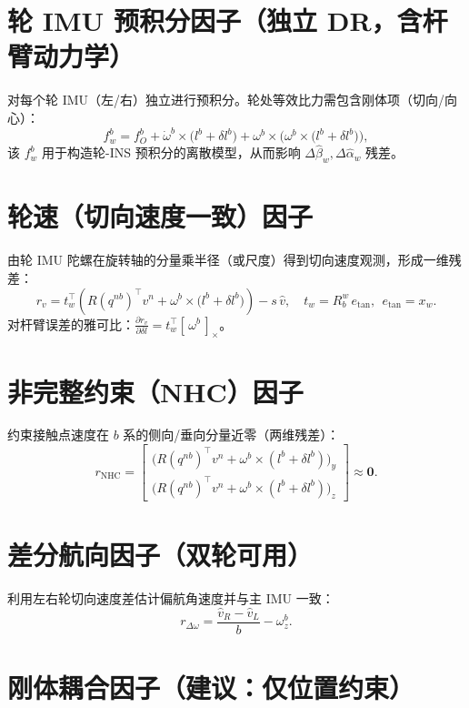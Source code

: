 \documentclass[11pt]{article}
\begin{document}
\section{轮 IMU 预积分因子（独立 DR，含杆臂动力学）}
对每个轮 IMU（左/右）独立进行预积分。轮处等效比力需包含刚体项（切向/向心）：
\begin{equation}
f_{w}^b = f_O^b + \dot{\omega}^b \times \big(l^b + \delta l^b\big)
+ \omega^b \times \Big(\omega^b \times \big(l^b + \delta l^b\big)\Big),
\end{equation}
该 $f_{w}^b$ 用于构造轮-INS 预积分的离散模型，从而影响 $\Delta\hat{\beta}_w,\Delta\hat{\alpha}_w$ 残差。

\section{轮速（切向速度一致）因子}
由轮 IMU 陀螺在旋转轴的分量乘半径（或尺度）得到切向速度观测，形成一维残差：
\begin{equation}
r_v = t_w^\top \left( R(q^{nb})^\top v^n + \omega^b \times \big(l^b + \delta l^b\big) \right) - s\,\hat v,
\quad
t_w = R_b^{w}\, e_{\mathrm{tan}},\ \ e_{\mathrm{tan}}=x_w.
\end{equation}
对杆臂误差的雅可比：$\displaystyle \frac{\partial r_v}{\partial \delta l} = t_w^\top [\,\omega^b\,]_\times$。

\section{非完整约束（NHC）因子}
约束接触点速度在 $b$ 系的侧向/垂向分量近零（两维残差）：
\begin{equation}
r_{\mathrm{NHC}} =
\begin{bmatrix}
\big(R(q^{nb})^\top v^n + \omega^b \times (l^b + \delta l^b)\big)_y \\
\big(R(q^{nb})^\top v^n + \omega^b \times (l^b + \delta l^b)\big)_z
\end{bmatrix}
\approx \bm{0}.
\end{equation}

\section{差分航向因子（双轮可用）}
利用左右轮切向速度差估计偏航角速度并与主 IMU 一致：
\begin{equation}
r_{\Delta\omega} = \frac{\hat v_R - \hat v_L}{b} - \omega_z^b.
\end{equation}

\section{刚体耦合因子（建议：仅位置约束）}
\end{document}
